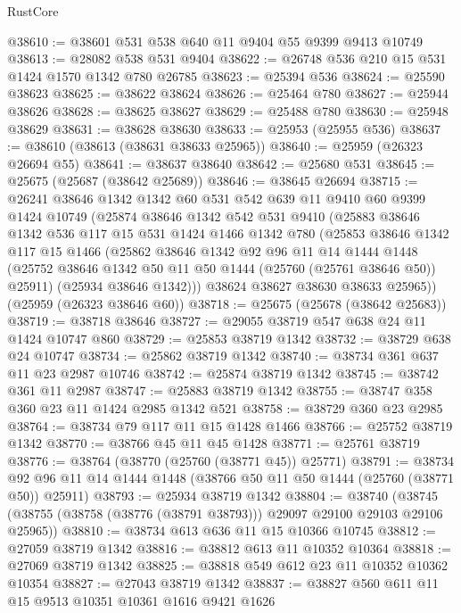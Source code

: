 \begin{lexlean}{RustCore}
\begin{coremodule}
@38610 := @38601 @531 @538 @640 @11 @9404 @55 @9399 @9413 @10749
@38613 := @28082 @538 @531 @9404
@38622 := @26748 @536 @210 @15 @531 @1424 @1570 @1342 @780 @26785
@38623 := @25394 @536
@38624 := @25590 @38623
@38625 := @38622 @38624
@38626 := @25464 @780
@38627 := @25944 @38626
@38628 := @38625 @38627
@38629 := @25488 @780
@38630 := @25948 @38629
@38631 := @38628 @38630
@38633 := @25953 (@25955 @536)
@38637 := @38610 (@38613 (@38631 @38633 @25965))
@38640 := @25959 (@26323 @26694 @55)
@38641 := @38637 @38640
@38642 := @25680 @531
@38645 := @25675 (@25687 (@38642 @25689))
@38646 := @38645 @26694
@38715 := @26241
    @38646
    @1342
    @1342
    @60
    @531
    @542
    @639
    @11
    @9410
    @60
    @9399
    @1424
    @10749
    (@25874
      @38646
      @1342
      @542
      @531
      @9410
      (@25883
        @38646
        @1342
        @536
        @117
        @15
        @531
        @1424
        @1466
        @1342
        @780
        (@25853
          @38646
          @1342
          @117
          @15
          @1466
          (@25862
            @38646
            @1342
            @92
            @96
            @11
            @14
            @1444
            @1448
            (@25752 @38646 @1342 @50 @11 @50 @1444 (@25760 (@25761 @38646 @50)) @25911)
            (@25934 @38646 @1342)))
        @38624
        @38627
        @38630
        @38633
        @25965))
    (@25959 (@26323 @38646 @60))
@38718 := @25675 (@25678 (@38642 @25683))
@38719 := @38718 @38646
@38727 := @29055 @38719 @547 @638 @24 @11 @1424 @10747 @860
@38729 := @25853 @38719 @1342
@38732 := @38729 @638 @24 @10747
@38734 := @25862 @38719 @1342
@38740 := @38734 @361 @637 @11 @23 @2987 @10746
@38742 := @25874 @38719 @1342
@38745 := @38742 @361 @11 @2987
@38747 := @25883 @38719 @1342
@38755 := @38747 @358 @360 @23 @11 @1424 @2985 @1342 @521
@38758 := @38729 @360 @23 @2985
@38764 := @38734 @79 @117 @11 @15 @1428 @1466
@38766 := @25752 @38719 @1342
@38770 := @38766 @45 @11 @45 @1428
@38771 := @25761 @38719
@38776 := @38764 (@38770 (@25760 (@38771 @45)) @25771)
@38791 := @38734 @92 @96 @11 @14 @1444 @1448 (@38766 @50 @11 @50 @1444 (@25760 (@38771 @50)) @25911)
@38793 := @25934 @38719 @1342
@38804 := @38740
    (@38745 (@38755 (@38758 (@38776 (@38791 @38793))) @29097 @29100 @29103 @29106 @25965))
@38810 := @38734 @613 @636 @11 @15 @10366 @10745
@38812 := @27059 @38719 @1342
@38816 := @38812 @613 @11 @10352 @10364
@38818 := @27069 @38719 @1342
@38825 := @38818 @549 @612 @23 @11 @10352 @10362 @10354
@38827 := @27043 @38719 @1342
@38837 := @38827 @560 @611 @11 @15 @9513 @10351 @10361 @1616 @9421 @1626

\end{coremodule}
\end{lexlean}
